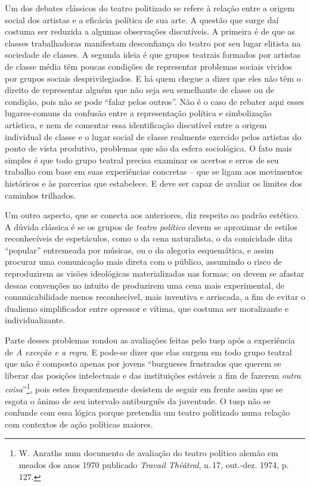 \noindent{}Um dos debates clássicos do teatro politizado se refere à relação entre
a origem social dos artistas e a eficácia política de sua arte. A
questão que surge daí costuma ser reduzida a algumas observações
discutíveis. A primeira é de que as classes trabalhadoras manifestam
desconfiança do teatro por seu lugar elitista na sociedade de classes. A
segunda ideia é que grupos teatrais formados por artistas de classe
média têm poucas condições de representar problemas sociais vividos por
grupos sociais desprivilegiados. E há quem chegue a dizer que eles não
têm o direito de representar alguém que não seja seu semelhante de
classe ou de condição, pois não se pode “falar pelos outros”. Não é o
caso de rebater aqui esses lugares-comuns da confusão entre a
representação política e simbolização artística, e nem de comentar essa
identificação discutível entre a origem individual de classe e o lugar
social de classe realmente exercido pelos artistas do ponto de vista
produtivo, problemas que são da esfera sociológica. O fato mais simples
é que todo grupo teatral precisa examinar os acertos e erros de seu
trabalho com base em suas experiências concretas -- que se ligam aos
movimentos históricos e às parcerias que estabelece. E deve ser capaz de
avaliar os limites dos caminhos trilhados.

Um outro aspecto, que se conecta aos anteriores, diz respeito ao padrão
estético. A dúvida clássica é se os grupos de {\it teatro político}
devem se aproximar de estilos reconhecíveis de espetáculos, como o da
cena naturalista, o da comicidade dita “popular” entremeada por músicas,
ou o da alegoria esquemática, e assim procurar uma comunicação mais
direta com o público, assumindo o risco de reproduzirem as visões
ideológicas materializadas nas formas; ou devem se afastar dessas
convenções no intuito de produzirem uma cena mais experimental, de
comunicabilidade menos reconhecível, mais inventiva e arriscada, a fim
de evitar o dualismo simplificador entre opressor e vítima, que costuma
ser moralizante e individualizante.

Parte desses problemas rondou as avaliações feitas pelo {\sc tusp} após a
experiência de {\it A exceção e a regra}. E pode-se dizer que elas
surgem em todo grupo teatral que não é composto apenas por jovens
“burgueses frustrados que querem se liberar das posições intelectuais e
das instituições estáveis a fim de fazerem {\it outra
coisa}”\footnote{W. Anraths num documento de avaliação do teatro
  político alemão em meados dos anos 1970 publicado {\it Travail
  Théâtral}, n.\,17, out.-dez. 1974, p.\,127.}, pois estes frequentemente
desistem de seguir em frente assim que se esgota o ânimo de seu
intervalo antiburguês da juventude. O {\sc tusp} não se confunde com essa
lógica porque pretendia um teatro politizado numa relação com contextos
de ação políticas maiores.

